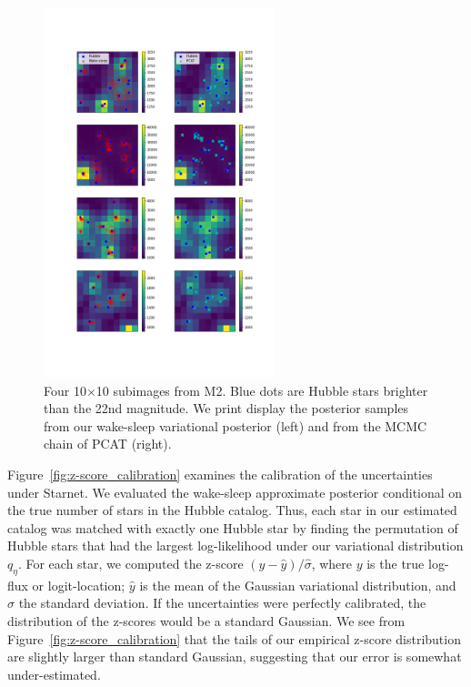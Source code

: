 \begin{figure}[H]
    \centering
    \includegraphics[width=0.6\textwidth]{figures/example_subimages_samples.png}
    \caption{Four 10$\times$10 subimages from
    M2. Blue dots are Hubble stars brighter than the 22nd magnitude.
    We print display the posterior samples from our wake-sleep variational
    posterior (left) and from the MCMC chain of PCAT (right). }
    \label{fig:example_subimages_sampled}
\end{figure}
\newpage

Figure~\ref{fig:z-score_calibration} examines the calibration of the uncertainties under Starnet. We evaluated the wake-sleep approximate posterior 
conditional on the true number of stars in the Hubble catalog. 
Thus, each star in our estimated catalog was matched with exactly one Hubble star
by finding the permutation of Hubble stars that had the largest log-likelihood under our variational distribution $q_\eta$. For each star, we computed the z-score $(y - \hat y) / \hat \sigma$, where $y$ is the true log-flux or 
logit-location; $\hat y$ is the mean of the Gaussian variational distribution, and $\hat\sigma$ the standard deviation.
If the uncertainties were perfectly calibrated, the distribution of the z-scores would be a standard Gaussian. 
We see from Figure~\ref{fig:z-score_calibration} that 
the tails of our empirical z-score distribution are slightly larger than standard Gaussian, suggesting that our error is somewhat under-estimated. 

